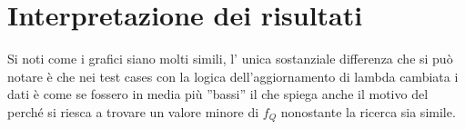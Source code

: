 \documentclass[12pt, letterpaper]{article}
\begin{document}
\section{Interpretazione dei risultati}
Si noti come i grafici siano molti simili, l' unica sostanziale differenza che si può notare è che
nei test cases con la logica dell'aggiornamento di lambda cambiata i dati è come se fossero in media
più ''bassi'' il che spiega anche il motivo del perché si riesca a trovare un valore minore di \(f_Q\)
nonostante la ricerca sia simile.
\end{document}
